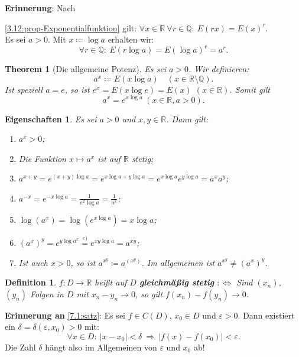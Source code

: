 \documentclass[12pt]{extreport} %
\newcommand{\Q}{\mathbb{Q}}
\newcommand{\R}{\mathbb{R}}
\theoremstyle{named}
\newtheorem{unnamedtheorem}{Theorem} \counterwithin{unnamedtheorem}{chapter}
\theoremstyle{itshape}
\newtheorem*{definition}{Definition}
\theoremstyle{normal}
\newtheorem*{eigenschaften}{Eigenschaften}
\begin{document}
\textbf{Erinnerung}: Nach {\ref{3.12:prop-Exponentialfunktion} gilt: $\forall x \in \R ~\forall r \in \Q: ~ E(rx) = E(x)^{r}$. \\
	Es sei $a > 0$. Mit $x \coloneqq \log a$ erhalten wir:
		$$ \forall r \in \Q: ~ E(r \log a) = E(\log a)^{r} = a^{r}. $$

\begin{unnamedtheorem}[Die allgemeine Potenz] \label{7.15:prop-AllgPotenz}
	Es sei $a > 0$. Wir definieren:
	$$ a^{x} \coloneqq E(x \log a) \quad (x \in \R\setminus \Q). $$
	Ist speziell $a = e$, so ist $e^{x} = E(x \log e) = E(x)$ $(x \in \R)$. Somit gilt
	$$ a^{x} = e^{x \log a} ~(x \in \R, a > 0). $$ 
\end{unnamedtheorem}


\begin{eigenschaften}
	Es sei $a > 0$ und $x, y \in \R$. Dann gilt:
	\begin{enumerate}
	        \item $a^{x} > 0$;
		\item Die Funktion $x \mapsto a^{x}$ ist auf $\R$ stetig;
		\item $a^{x+y} = e^{(x+y)\log a} = e^{x\log a + y \log a} = e^{x \log a} e^{y \log a} = a^{x} a^{y}$;
		\item $a^{-x} = e^{-x\log a} = \frac{1}{e^{x} \log a} = \frac{1}{a^{x}}$;
		\item $\log(a^{x}) = \log ( e^{x \log a}) = x \log a$;
		\item $(a^{x})^{y} = e^{y \log a^{x}} \overset{e)}{=} e^{xy \log a} = a^{xy}$;
		\item Ist auch $x > 0$, so ist $a^{x^{y}} \coloneqq a^{\left(x^{y}\right)}$. Im allgemeinen ist $a^{x^{y}} \not= (a^{x})^{y}$.
	\end{enumerate}	
\end{eigenschaften}




\begin{definition}
	$f \colon D \rightarrow \R$ hei{\ss}t auf $D$ \textbf{gleichmä{\ss}ig stetig} $:\iff$ Sind $(x_n)$, $(y_n)$ Folgen in $D$ mit $x_n-y_n \to 0$,
	so gilt $f(x_n)-f(y_n) \to 0$.
\end{definition}	
	
\textbf{Erinnerung an} \ref{7.1:satz}: Es sei $f \in C(D)$, $x_{0} \in D$ und $\varepsilon > 0$. Dann existiert ein $\delta = \delta(\varepsilon, x_{0}) > 0$ mit:
	$$ \forall x \in D: ~ |x - x_{0}| < \delta ~ \Rightarrow ~ |f(x) - f(x_{0})| < \varepsilon. $$
	Die Zahl $\delta$ hängt also im Allgemeinen von $\varepsilon$ und $x_{0}$ ab!	
	
}
\end{document}
